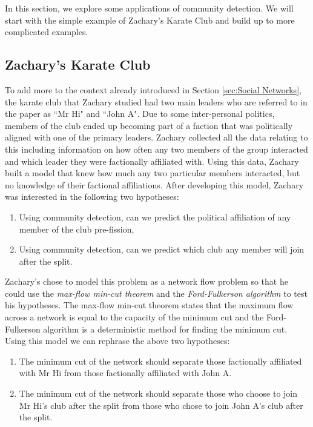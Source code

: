 In this section, we explore some applications of community detection. We will start with the simple example of Zachary's Karate Club and build up to more complicated examples.

\subsection{Zachary's Karate Club}
To add more to the context already introduced in Section \ref{sec:Social Networks}, the karate club that Zachary studied had two main leaders who are referred to in the paper as ``Mr Hi" and ``John A". Due to some inter-personal politics, members of the club ended up becoming part of a faction that was politically aligned with one of the primary leaders. Zachary collected all the data relating to this including information on how often any two members of the group interacted and which leader they were factionally affiliated with. Using this data, Zachary built a model that knew how much any two particular members interacted, but no knowledge of their factional affiliations. After developing this model, Zachary was interested in the following two hypotheses:

\begin{enumerate}
    \item Using community detection, can we predict the political affiliation of any member of the club pre-fission,
    \item Using community detection, can we predict which club any member will join after the split.
\end{enumerate}

Zachary's chose to model this problem as a network flow problem so that he could use the \emph{max-flow min-cut theorem} and the \emph{Ford-Fulkerson algorithm}\cite{ford_fulkerson_1956} to test his hypotheses. The max-flow min-cut theorem states that the maximum flow across a network is equal to the capacity of the minimum cut and the Ford-Fulkerson algorithm is a deterministic method for finding the minimum cut. Using this model we can rephrase the above two hypotheses:

\begin{enumerate}
    \item The minimum cut of the network should separate those factionally affiliated with Mr Hi from those factionally affiliated with John A.
    \item The minimum cut of the network should separate those who choose to join Mr Hi's club after the split from those who chose to join John A's club after the split.
\end{enumerate}

